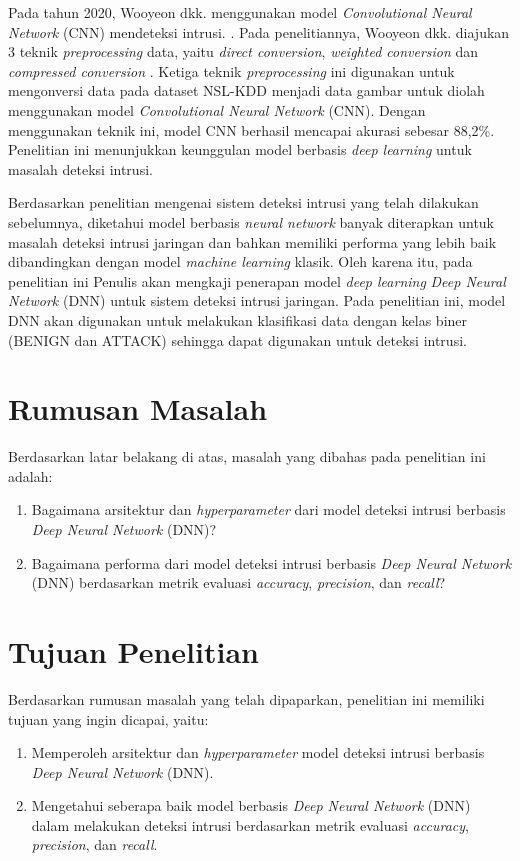 \documentclass[a4paper,12pt]{report}
\begin{document}
Pada tahun 2020, Wooyeon dkk. menggunakan model \textit{Convolutional Neural Network} (CNN) mendeteksi intrusi. \cite{joPacketPreprocessingCNNBased2020}. Pada penelitiannya, Wooyeon dkk. diajukan 3 teknik \textit{preprocessing} data, yaitu \textit{direct conversion}, \textit{weighted conversion} dan \textit{compressed conversion} \cite{joPacketPreprocessingCNNBased2020}. Ketiga teknik \textit{preprocessing} ini digunakan untuk mengonversi data pada dataset NSL-KDD menjadi data gambar untuk diolah menggunakan model \textit{Convolutional Neural Network} (CNN). Dengan menggunakan teknik ini, model CNN berhasil mencapai akurasi sebesar 88,2\%. Penelitian ini menunjukkan keunggulan model berbasis \textit{deep learning} untuk masalah deteksi intrusi.

Berdasarkan penelitian mengenai sistem deteksi intrusi yang telah dilakukan sebelumnya, diketahui model berbasis \textit{neural network} banyak diterapkan untuk masalah deteksi intrusi jaringan dan bahkan memiliki performa yang lebih baik dibandingkan dengan model \textit{machine learning} klasik. Oleh karena itu, pada penelitian ini Penulis akan mengkaji penerapan model \textit{deep learning} \textit{Deep Neural Network} (DNN) untuk sistem deteksi intrusi jaringan. Pada penelitian ini, model DNN akan digunakan untuk melakukan klasifikasi data dengan kelas biner (BENIGN dan ATTACK) sehingga dapat digunakan untuk deteksi intrusi. 

\section{Rumusan Masalah}

Berdasarkan latar belakang di atas, masalah yang dibahas pada penelitian ini adalah:
\begin{enumerate}
	\item Bagaimana arsitektur dan \textit{hyperparameter} dari model deteksi intrusi berbasis \textit{Deep Neural Network} (DNN)?
	\item Bagaimana performa dari model deteksi intrusi berbasis \textit{Deep Neural Network} (DNN) berdasarkan metrik evaluasi \textit{accuracy}, \textit{precision}, dan \textit{recall}?
\end{enumerate}

\section{Tujuan Penelitian}

Berdasarkan rumusan masalah yang telah dipaparkan, penelitian ini memiliki tujuan yang ingin dicapai, yaitu:
\begin{enumerate}
	\item Memperoleh arsitektur dan  \textit{hyperparameter} model deteksi intrusi berbasis \textit{Deep Neural Network} (DNN).
	\item Mengetahui seberapa baik model berbasis \textit{Deep Neural Network} (DNN) dalam melakukan deteksi intrusi berdasarkan metrik evaluasi \textit{accuracy}, \textit{precision}, dan \textit{recall}.
\end{enumerate} 
\end{document}
